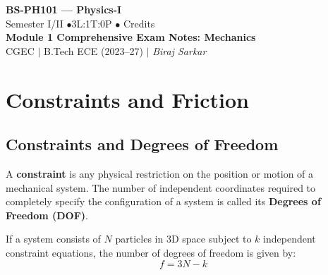 \documentclass[12pt,a4paper]{article}
\begin{document}
\begin{center}
  {\LARGE\bfseries\color{myred} BS-PH101 --- Physics-I}\\[5pt]
  {\normalsize\color{mydark} Semester I/II \quad$\bullet$\quad 3L:1T:0P \quad$\bullet$ Credits}\\[3pt]
  {\normalsize\color{myteal}\textbf{Module 1 Comprehensive Exam Notes: Mechanics}}\\[3pt]
  {\small\color{mydark} CGEC \;$|$\; B.Tech ECE (2023--27) \;$|$\; \textit{Biraj Sarkar}}
\end{center}
\vspace{2pt}
\noindent{\color{myred}\rule{\linewidth}{1.5pt}}
\vspace{2pt}
\hypersetup{linkcolor=mydark}
\tableofcontents
\hypersetup{linkcolor=myteal}
\newpage

\section{Constraints and Friction}

\subsection{Constraints and Degrees of Freedom}

\begin{tcolorbox}[defbox, title={\textbf{Definition: Constraint and Degrees of Freedom}}]
A \textbf{constraint} is any physical restriction on the position or motion of a mechanical system. The number of independent coordinates required to completely specify the configuration of a system is called its \textbf{Degrees of Freedom (DOF)}.
\end{tcolorbox}

If a system consists of $N$ particles in 3D space subject to $k$ independent constraint equations, the number of degrees of freedom is given by:
\begin{equation}
f = 3N - k
\end{equation}
\end{document}
